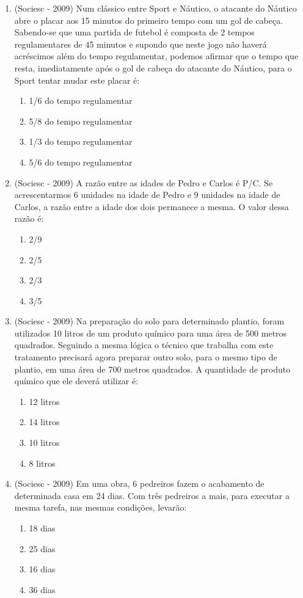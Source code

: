 \begin{enumerate}
    
    \item (Sociesc - 2009) Num clássico entre Sport e Náutico, o atacante do Náutico abre o placar aos 15 minutos do primeiro tempo com um gol de cabeça. Sabendo-se que uma partida de futebol é composta de 2 tempos regulamentares de 45 minutos e supondo que neste jogo não haverá acréscimos além do tempo regulamentar, podemos afirmar que o tempo que resta, imediatamente após o gol de cabeça do atacante do Náutico, para o Sport tentar mudar este placar é:
  \begin{enumerate}
  \item 1/6 do tempo regulamentar
  \item 5/8 do tempo regulamentar
  \item 1/3 do tempo regulamentar
  \item 5/6 do tempo regulamentar
 \end{enumerate}
 
 \item (Sociesc - 2009) A razão entre as idades de Pedro e Carlos é P/C. Se acrescentarmos 6 unidades na idade de Pedro e 9 unidades na idade de Carlos, a razão entre a idade dos dois permanece a mesma. O valor dessa razão é:
  \begin{enumerate}
  \item 2/9
  \item 2/5
  \item 2/3
  \item 3/5
 \end{enumerate}
 
  \item (Sociesc - 2009) Na preparação do solo para determinado plantio, foram utilizados 10 litros de um produto químico para uma área de 500 metros quadrados. Seguindo a mesma lógica o técnico que trabalha
 com este tratamento precisará agora preparar outro solo, para o mesmo tipo de plantio, em uma área de 700 metros quadrados. A quantidade de produto químico que ele deverá utilizar é:
 \begin{enumerate}
  \item 12 litros
  \item 14 litros
  \item 10 litros
  \item 8 litros
 \end{enumerate}
 
 \item (Sociesc - 2009) Em uma obra, 6 pedreiros fazem o acabamento de determinada casa em 24 dias. Com três pedreiros a mais, para executar a mesma tarefa, nas mesmas condições, levarão:
  \begin{enumerate}
  \item 18 dias
  \item 25 dias
  \item 16 dias
  \item 36 dias
 \end{enumerate}
 

\end{enumerate}
